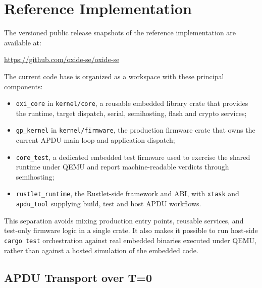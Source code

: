 \chapter{Reference Implementation}

The versioned public release snapshots of the reference implementation are
available at:

\begin{center}
\url{https://github.com/oxide-se/oxide-se}
\end{center}

The current code base is organized as a workspace with these principal
components:

\begin{itemize}
\item \texttt{oxi\_core} in \texttt{kernel/core}, a reusable embedded library
  crate that provides the
  runtime, target dispatch, serial, semihosting, flash and crypto
  services;
\item \texttt{gp\_kernel} in \texttt{kernel/firmware}, the production firmware
  crate that owns the
  current APDU main loop and application dispatch;
\item \texttt{core\_test}, a dedicated embedded test firmware used to
  exercise the shared runtime under QEMU and report machine-readable
  verdicts through semihosting;
\item \texttt{rustlet\_runtime}, the Rustlet-side framework and ABI, with
  \texttt{xtask} and \texttt{apdu\_tool} supplying build, test and host APDU
  workflows.
\end{itemize}

This separation avoids mixing production entry points, reusable
services, and test-only firmware logic in a single crate. It also makes
it possible to run host-side \texttt{cargo test} orchestration against
real embedded binaries executed under QEMU, rather than against a hosted
simulation of the embedded code.

\section{APDU Transport over T=0}
\label{sec:impl-apdu-t0}

